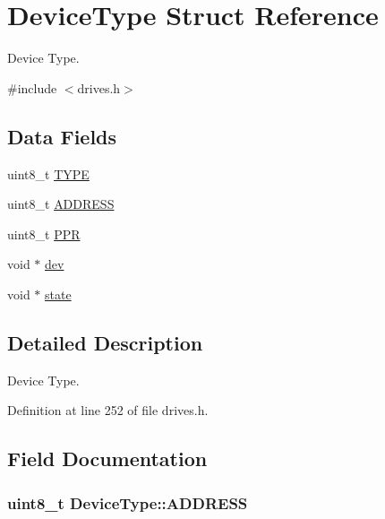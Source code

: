 \hypertarget{structDeviceType}{}\section{Device\+Type Struct Reference}
\label{structDeviceType}


Device Type.  




{\ttfamily \#include $<$drives.\+h$>$}

\subsection*{Data Fields}
\begin{DoxyCompactItemize}
\item 
uint8\+\_\+t \hyperlink{structDeviceType_acee5219162b6f47a9423b2086d127ede}{T\+Y\+PE}
\item 
uint8\+\_\+t \hyperlink{structDeviceType_a62529b7435785e39e8e7c5019303c2dd}{A\+D\+D\+R\+E\+SS}
\item 
uint8\+\_\+t \hyperlink{structDeviceType_ae0e59c6c17582ff80bdab3f2010e8d57}{P\+PR}
\item 
void $\ast$ \hyperlink{structDeviceType_a59fc3b3cb45f8ee0cd1016bd64804d3b}{dev}
\item 
void $\ast$ \hyperlink{structDeviceType_ad0fc43d63606bab6c259047e36512e08}{state}
\end{DoxyCompactItemize}


\subsection{Detailed Description}
Device Type. 

Definition at line 252 of file drives.\+h.



\subsection{Field Documentation}
\subsubsection[{\texorpdfstring{A\+D\+D\+R\+E\+SS}{ADDRESS}}]{\setlength{\rightskip}{0pt plus 5cm}uint8\+\_\+t Device\+Type\+::\+A\+D\+D\+R\+E\+SS}\hypertarget{structDeviceType_a62529b7435785e39e8e7c5019303c2dd}{}\label{structDeviceType_a62529b7435785e39e8e7c5019303c2dd}


